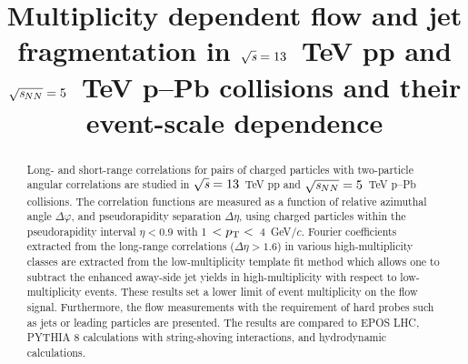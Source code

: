 \documentclass[ALICE,manyauthors]{cernphprep}
\begin{document}
\begin{titlepage}

\PHyear{}
\PHdate{\today}
%

\title{Multiplicity dependent flow and jet fragmentation in ${\sqrt{{\textit s}}}=13$~TeV pp and ${\sqrt{{\textit s_{NN}}}}=5$~TeV p--Pb collisions and their event-scale dependence}


\begin{abstract}
%
Long- and short-range correlations for pairs of charged particles with two-particle angular correlations are studied in ${\sqrt{{\textit s}}}=13$~TeV pp and ${\sqrt{{\textit s_{NN}}}}=5$~TeV p--Pb collisions. The correlation functions are measured as a function of relative azimuthal angle $\Delta\varphi$, and pseudorapidity separation $\Delta\eta$, using charged particles within the pseudorapidity interval $\eta < 0.9$ with 1~$ < p_\mathrm{T} < $~4~GeV/$c$.
Fourier coefficients extracted from the long-range correlations ($\Delta\eta > 1.6$) in various high-multiplicity classes are extracted from the low-multiplicity template fit method which allows one to subtract the enhanced away-side jet yields in high-multiplicity with respect to low-multiplicity events. These results set a lower limit of event multiplicity on the flow signal. Furthermore, the flow measurements with the requirement of hard probes such as jets or leading particles are presented. The results are compared to EPOS LHC, PYTHIA 8 calculations with string-shoving interactions, and hydrodynamic calculations.




\end{abstract}

\end{titlepage}

\setcounter{page}{2}

\end{document}
